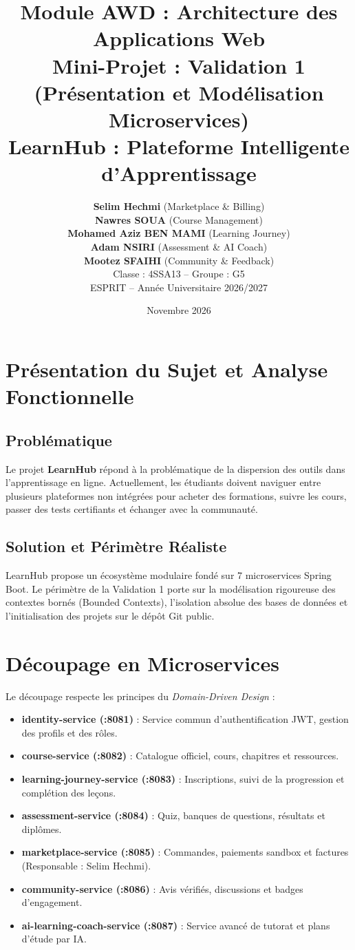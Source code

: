 \documentclass[11pt,a4paper]{article}
\title{\textbf{Module AWD : Architecture des Applications Web}\\ \Large Mini-Projet : Validation 1 (Présentation et Modélisation Microservices)\\ \huge \textbf{LearnHub : Plateforme Intelligente d'Apprentissage}}
\author{\textbf{Selim Hechmi} (Marketplace \& Billing) \\ \textbf{Nawres SOUA} (Course Management) \\ \textbf{Mohamed Aziz BEN MAMI} (Learning Journey) \\ \textbf{Adam NSIRI} (Assessment \& AI Coach) \\ \textbf{Mootez SFAIHI} (Community \& Feedback) \\ Classe : 4SSA13 -- Groupe : G5 \\ ESPRIT -- Année Universitaire 2026/2027}
\date{Novembre 2026}
\begin{document}
\maketitle
\tableofcontents
\newpage

\section{Présentation du Sujet et Analyse Fonctionnelle}
\subsection{Problématique}
Le projet \textbf{LearnHub} répond à la problématique de la dispersion des outils dans l'apprentissage en ligne. Actuellement, les étudiants doivent naviguer entre plusieurs plateformes non intégrées pour acheter des formations, suivre les cours, passer des tests certifiants et échanger avec la communauté.

\subsection{Solution et Périmètre Réaliste}
LearnHub propose un écosystème modulaire fondé sur 7 microservices Spring Boot. Le périmètre de la Validation 1 porte sur la modélisation rigoureuse des contextes bornés (Bounded Contexts), l'isolation absolue des bases de données et l'initialisation des projets sur le dépôt Git public.

\section{Découpage en Microservices}
Le découpage respecte les principes du \textit{Domain-Driven Design} :
\begin{itemize}
    \item \textbf{identity-service (:8081)} : Service commun d'authentification JWT, gestion des profils et des rôles.
    \item \textbf{course-service (:8082)} : Catalogue officiel, cours, chapitres et ressources.
    \item \textbf{learning-journey-service (:8083)} : Inscriptions, suivi de la progression et complétion des leçons.
    \item \textbf{assessment-service (:8084)} : Quiz, banques de questions, résultats et diplômes.
    \item \textbf{marketplace-service (:8085)} : Commandes, paiements sandbox et factures (Responsable : Selim Hechmi).
    \item \textbf{community-service (:8086)} : Avis vérifiés, discussions et badges d'engagement.
    \item \textbf{ai-learning-coach-service (:8087)} : Service avancé de tutorat et plans d'étude par IA.
\end{itemize}
\end{document}
